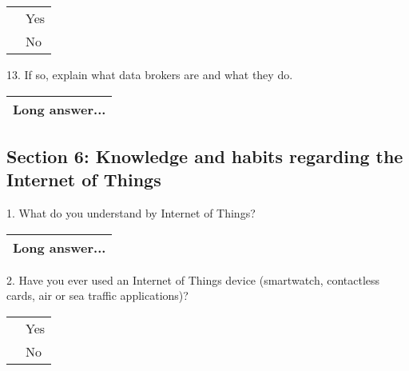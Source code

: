 \vspace{0.6cm}
\begin{center}
    \noindent\begin{tabularx}{0.8\textwidth}{ >{\centering\arraybackslash}X >{\raggedright\arraybackslash}X }
        {\huge $\circ$} & Yes \\[0.2cm]
        {\huge $\circ$} & No
    \end{tabularx}
\end{center}
\vspace{0.6cm}

13. If so, explain what data brokers are and what they do.

\vspace{0.6cm}
\begin{center}
    \noindent\begin{tabularx}{0.9\textwidth}{ |>{\raggedright\arraybackslash}X| }
        \hline
        \hspace{0.2cm}Long answer...\vspace{1.75cm} \\
        \hline
    \end{tabularx}
\end{center}
\vspace{0.6cm}

\subsection*{Section 6: Knowledge and habits regarding the Internet of Things}

1. What do you understand by Internet of Things?

\vspace{0.6cm}
\begin{center}
    \noindent\begin{tabularx}{0.9\textwidth}{ |>{\raggedright\arraybackslash}X| }
        \hline
        \hspace{0.2cm}Long answer...\vspace{1.75cm} \\
        \hline
    \end{tabularx}
\end{center}
\vspace{0.6cm}

2. Have you ever used an Internet of Things device (smartwatch, contactless cards, air or sea traffic applications)?

\vspace{0.6cm}
\begin{center}
    \noindent\begin{tabularx}{0.8\textwidth}{ >{\centering\arraybackslash}X >{\raggedright\arraybackslash}X }
        {\huge $\circ$} & Yes \\[0.2cm]
        {\huge $\circ$} & No
    \end{tabularx}
\end{center}
\vspace{0.6cm}

